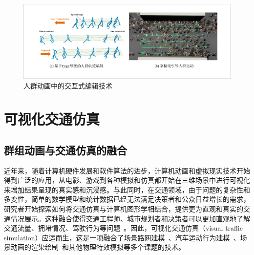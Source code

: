 \begin{figure}[!tbh]
\centering
\includegraphics[width=\textwidth]{figure/intro/crowd interactive v2.pdf}
\caption[人群动画中的交互式编辑技术]{
人群动画中的交互式编辑技术
}
\label{fig:intro_intercrowd}
\end{figure}





\section{可视化交通仿真}


\subsection{群组动画与交通仿真的融合}

近年来，随着计算机硬件发展和软件算法的进步，计算机动画和虚拟现实技术开始得到广泛的应用，从电影、游戏到各种模拟和仿真都开始在三维场景中进行可视化来增加结果呈现的真实感和沉浸感。与此同时，在交通领域，由于问题的复杂性和多变性，简单的数学模型和统计数据已经无法满足决策者和公众日益增长的需求，研究者开始探索如何将交通仿真与计算机图形学相结合，提供更为直观和真实的交通情况展示。这种融合使得交通工程师、城市规划者和决策者可以更加直观地了解交通流量、拥堵情况、驾驶行为等问题~\cite{wang2017survey}。因此，可视化交通仿真（visual traffic simulation）应运而生，这是一项融合了场景路网建模~\cite{chen2008interactive, bruneton2008real, galin2010procedural, galin2011authoring}、汽车运动行为建模~\cite{reynolds1999steering, reynolds1987flocks}、场景动画的渲染绘制~\cite{tecchia2002image, o2002levels}和其他物理特效模拟等多个课题的技术。

